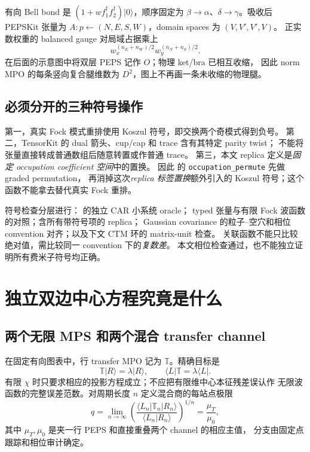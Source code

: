 \documentclass[11pt]{article}
\newcommand{\code}[1]{{\small\texttt{#1}}}
\begin{document}
有向 Bell bond 是 $(1+w f_1^\dagger f_2^\dagger)|0\rangle$，顺序固定为
$\beta\to\alpha$、$\delta\to\gamma$。吸收后 PEPSKit 张量为
$A:p\leftarrow(N,E,S,W)$，domain spaces 为 $(V,V',V',V)$。
正实数权重的 balanced gauge 对局域占据乘上
\begin{equation}
 w_x^{(n_E+n_W)/2}w_y^{(n_N+n_S)/2}.
\end{equation}
在后面的示意图中将双层 PEPS 记作 $O$；物理 ket/bra 已相互收缩，
因此 norm MPO 的每条竖向复合腿维数为 $D^2$，图上不再画一条未收缩的物理腿。

\subsection{必须分开的三种符号操作}
第一，真实 Fock 模式重排使用 Koszul 符号，即交换两个奇模式得到负号。
第二，TensorKit 的 dual 箭头、cup/cap 和 trace 含有其特定 parity twist；
不能将张量直接转成普通数组后随意转置或作普通 trace。
第三，本文 replica 定义是\emph{固定 occupation coefficient 空间}中的置换。
因此  的 \code{occupation\_permute} 先做 graded permutation，
再消掉这次\emph{replica 标签置换}额外引入的 Koszul 符号；这个函数不能拿去替代真实 Fock 重排。

符号检查分层进行： 的独立 CAR 小系统 oracle；
typed 张量与有限 Fock 波函数的对照；含所有带符号项的 replica；
Gaussian covariance 的粒子--空穴和相位 convention 对齐；以及下文 CTM 环的 matrix-unit 检查。
关联函数不能只比较绝对值，需比较同一 convention 下的\emph{复数差}。
本文相位检查通过，也不能独立证明所有费米子符号均正确。

\section{独立双边中心方程究竟是什么}
\label{sec:paired}
\subsection{两个无限 MPS 和两个混合 transfer channel}
在固定有向图表中，行 transfer MPO 记为 $\mathbb T$。精确目标是
\begin{equation}
 \mathbb T|R\rangle=\lambda|R\rangle,\qquad
 \langle L|\mathbb T=\lambda\langle L|.
 \label{eq:exact}
\end{equation}
有限 $\chi$ 时只要求相应的投影方程成立；不应把有限维中心本征残差误认作
无限波函数的完整误差范数。对周期长度 $n$ 定义混合商的每站点极限
\begin{equation}
 q=\lim_{n\to\infty}
 \left(\frac{\langle L_n|\mathbb T_n|R_n\rangle}
 {\langle L_n|R_n\rangle}\right)^{1/n}
 =\frac{\mu_T}{\mu_0},
 \label{eq:q}
\end{equation}
其中 $\mu_T,\mu_0$ 是夹一行 PEPS 和直接重叠两个 channel 的相应主值，
分支由固定点跟踪和相位审计确定。
\end{document}
